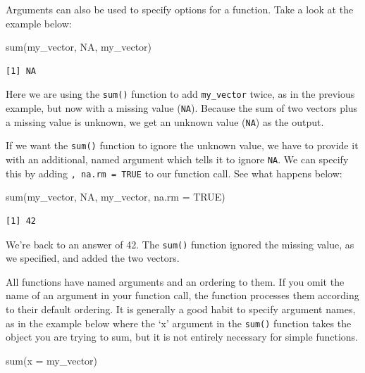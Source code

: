 \documentclass[
  letterpaper,
]{book}
\newenvironment{Shaded}{\begin{snugshade}}{\end{snugshade}}
\newcommand{\AttributeTok}[1]{\textcolor[rgb]{0.40,0.45,0.13}{#1}}
\newcommand{\ConstantTok}[1]{\textcolor[rgb]{0.56,0.35,0.01}{#1}}
\newcommand{\FunctionTok}[1]{\textcolor[rgb]{0.28,0.35,0.67}{#1}}
\newcommand{\NormalTok}[1]{\textcolor[rgb]{0.00,0.23,0.31}{#1}}
\begin{document}
Arguments can also be used to specify options for a function. Take a
look at the example below:

\begin{Shaded}
\begin{Highlighting}[]
\FunctionTok{sum}\NormalTok{(my\_vector, }\ConstantTok{NA}\NormalTok{, my\_vector)}
\end{Highlighting}
\end{Shaded}

\begin{verbatim}
[1] NA
\end{verbatim}

Here we are using the \texttt{sum()} function to add \texttt{my\_vector}
twice, as in the previous example, but now with a missing value
(\texttt{NA}). Because the sum of two vectors plus a missing value is
unknown, we get an unknown value (\texttt{NA}) as the output.

If we want the \texttt{sum()} function to ignore the unknown value, we
have to provide it with an additional, named argument which tells it to
ignore \texttt{NA}. We can specify this by adding
\texttt{,\ na.rm\ =\ TRUE} to our function call. See what happens below:

\begin{Shaded}
\begin{Highlighting}[]
\FunctionTok{sum}\NormalTok{(my\_vector, }\ConstantTok{NA}\NormalTok{, my\_vector, }\AttributeTok{na.rm =} \ConstantTok{TRUE}\NormalTok{)}
\end{Highlighting}
\end{Shaded}

\begin{verbatim}
[1] 42
\end{verbatim}

We're back to an answer of 42. The \texttt{sum()} function ignored the
missing value, as we specified, and added the two vectors.

All functions have named arguments and an ordering to them. If you omit
the name of an argument in your function call, the function processes
them according to their default ordering. It is generally a good habit
to specify argument names, as in the example below where the `x'
argument in the \texttt{sum()} function takes the object you are trying
to sum, but it is not entirely necessary for simple functions.

\begin{Shaded}
\begin{Highlighting}[]
\FunctionTok{sum}\NormalTok{(}\AttributeTok{x =}\NormalTok{ my\_vector)}
\end{Highlighting}
\end{Shaded}
\end{document}
